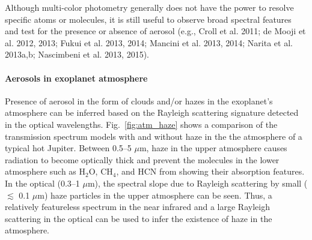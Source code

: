 Although multi-color photometry generally does not have the power to resolve specific atoms or molecules, it is still useful to observe broad spectral features and test for the presence or absence of aerosol (e.g., Croll et al. 2011; de Mooji et al. 2012, 2013; Fukui et al. 2013, 2014; Mancini et al. 2013, 2014; Narita et al. 2013a,b; Nascimbeni et al. 2013, 2015).  

\paragraph{Aerosols in exoplanet atmosphere}
Presence of aerosol in the form of clouds and/or hazes in the exoplanet's atmosphere can be inferred based on the Rayleigh scattering signature detected in the optical wavelengths. %
Fig.~\ref{fig:atm_haze} shows a comparison of the transmission spectrum models with and without haze in the the atmosphere of a typical hot Jupiter. Between 0.5--5 $\mu$m, haze in the upper atmosphere %
causes radiation to become optically thick and prevent the molecules in the lower atmosphere %
such as H$_2$O, CH$_4$, and HCN from showing their absorption features. %
In the optical (0.3–1 $\mu$m), the spectral slope due to Rayleigh scattering by small ($\lesssim$ 0.1 $\mu$m) haze particles in the upper atmosphere can be seen. Thus, a relatively featureless spectrum in the near infrared and a large Rayleigh scattering in the optical can be used to infer the existence of haze in the atmosphere. 

